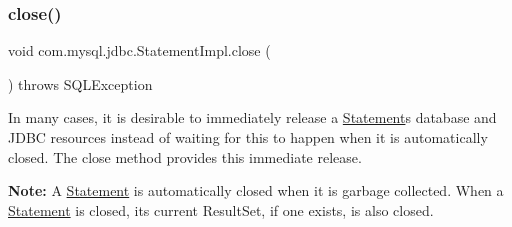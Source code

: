 \subsubsection{\texorpdfstring{close()}{close()}}
{\footnotesize\ttfamily void com.\+mysql.\+jdbc.\+Statement\+Impl.\+close (\begin{DoxyParamCaption}{ }\end{DoxyParamCaption}) throws S\+Q\+L\+Exception}

In many cases, it is desirable to immediately release a \mbox{\hyperlink{interfacecom_1_1mysql_1_1jdbc_1_1_statement}{Statement}}\textquotesingle{}s database and J\+D\+BC resources instead of waiting for this to happen when it is automatically closed. The close method provides this immediate release.

{\bfseries Note\+:} A \mbox{\hyperlink{interfacecom_1_1mysql_1_1jdbc_1_1_statement}{Statement}} is automatically closed when it is garbage collected. When a \mbox{\hyperlink{interfacecom_1_1mysql_1_1jdbc_1_1_statement}{Statement}} is closed, its current Result\+Set, if one exists, is also closed. 


